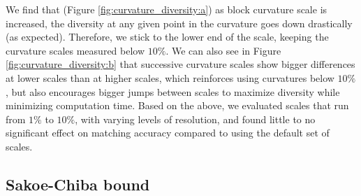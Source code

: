 We find that (Figure \ref{fig:curvature_diversity:a}) as block curvature scale is increased, the diversity at any given point in the curvature goes down drastically (as expected). 
Therefore, we stick to the lower end of the scale, keeping the curvature scales measured below $10\%$.
We can also see in Figure \ref{fig:curvature_diversity:b} that successive curvature scales show bigger differences at lower scales than at higher scales, which reinforces using curvatures below $10\%$, but also encourages bigger jumps between scales to maximize diversity while minimizing computation time.
Based on the above, we evaluated scales that run from $1\%$ to $10\%$, with varying levels of resolution, and found little to no significant effect on matching accuracy compared to using the default set of scales.


\subsection{Sakoe-Chiba bound}








